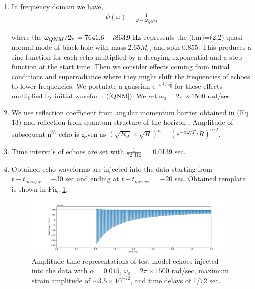 \documentclass[a4paper,11pt]{article}
\begin{document}
\begin{enumerate}

\item
In frequency domain we have,
\begin{eqnarray}
\psi (\omega)=\frac{1}{\omega - \omega_{QNM}} \label{QNM}
\end{eqnarray}

where the $\omega_{QNM}/2\pi=7641.6-i 863.9\ \rm{Hz}$ represents the (l,m)=(2,2) quasi-normal mode of black hole with mass $2.65 M_{\odot}$ and spin 0.855. This produces a sine function for each echo multiplied by a decaying exponential and a step function at the start time. Then we consider effects coming from initial conditions and superradiance where they might shift the frequencies of echoes to lower frequencies. We postulate a gaussian $e^{-\omega^{2}/\omega_{0}^{2}}$ for these effects multiplied by initial waveform (\ref{QNM}). We set $\omega_{0} = 2\pi\times 1500$ rad/sec.


\item We use reflection coefficient from angular momentum barrier obtained in \cite{Nakano:2017fvh} (Eq. 13) and reflection from quantum structure of the horizon \cite{Oshita:2018fqu}. Amplitude of subsequent n$^{th}$ echo is given as $\left(\sqrt{R_{H}} \times \sqrt{R} \right)^{n}=\left( {e^{-\alpha \omega/T_{H}}R} \right)^{n/2}$. 

\item Time intervals of echoes are set with $\frac{1}{72~ {\rm Hz}}$ = 0.0139 sec.

\item Obtained echo waveforms are injected into the data starting from $t-t_{merger}=-30$ sec and ending at $t-t_{merger}=-20$ sec. 
Obtained template is shown in Fig. \ref{echo_sequence}.
\begin{figure}[b]
    \includegraphics[width=1\textwidth]{echo_sequence.pdf}
 \caption{Amplitude-time representations of test model echoes injected into the data with $\alpha=0.015$, $\omega_{0}=2\pi \times 1500$ rad/sec, maximum strain amplitude of $\sim 3.5 \times 10^{-22}$, and time delays of 1/72 sec.}
 \label{echo_sequence}
\end{figure}


\end{enumerate}
\end{document}
